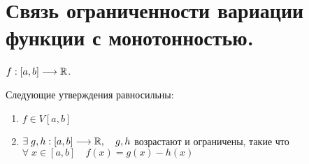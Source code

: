 \documentclass[../main.tex]{subfiles}
\begin{document}
\newpage
\section{Связь ограниченности вариации функции с монотонностью.}
\begin{thm}
    \( f: \left[ a,b\right] \longrightarrow \mathbb{R} \).

    Следующие утверждения равносильны:
    \begin{enumerate}
        \item \( f \in V\left[ a,b\right]\)
        \item \( \exists \; g,h: \left[ a,b\right] \longrightarrow \mathbb{R},\quad g,h\) возрастают и ограничены, такие что \\
        \( \forall \; x \in \left[ a,b\right]\quad f\left( x\right)=g\left( x\right)-h\left( x\right)\)
    \end{enumerate}
\end{thm}
\end{document}
